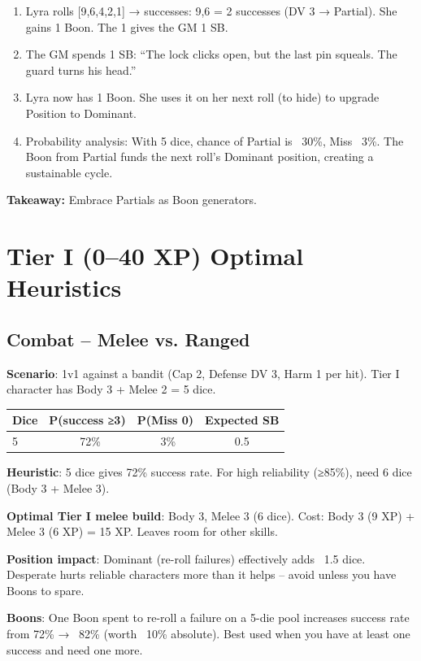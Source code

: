 \documentclass[11pt]{article}
\begin{document}
\begin{enumerate}
    \item Lyra rolls [9,6,4,2,1] → successes: 9,6 = 2 successes (DV 3 → Partial). She gains 1 Boon. The 1 gives the GM 1 SB.
    \item The GM spends 1 SB: “The lock clicks open, but the last pin squeals. The guard turns his head.”
    \item Lyra now has 1 Boon. She uses it on her next roll (to hide) to upgrade Position to Dominant.
    \item Probability analysis: With 5 dice, chance of Partial is ~30\%, Miss ~3\%. The Boon from Partial funds the next roll’s Dominant position, creating a sustainable cycle.
\end{enumerate}
\textbf{Takeaway:} Embrace Partials as Boon generators.

\section{Tier I (0–40 XP) Optimal Heuristics}

\subsection{Combat – Melee vs. Ranged}
\textbf{Scenario}: 1v1 against a bandit (Cap 2, Defense DV 3, Harm 1 per hit). Tier I character has Body 3 + Melee 2 = 5 dice.

\begin{table}[h]
\centering
\begin{tabular}{lccc}
\toprule
\textbf{Dice} & \textbf{P(success ≥3)} & \textbf{P(Miss 0)} & \textbf{Expected SB} \\
\midrule
5 & ~72\% & ~3\% & 0.5 \\
\bottomrule
\end{tabular}
\end{table}

\textbf{Heuristic}: 5 dice gives 72\% success rate. For high reliability (≥85\%), need 6 dice (Body 3 + Melee 3).

\textbf{Optimal Tier I melee build}: Body 3, Melee 3 (6 dice). Cost: Body 3 (9 XP) + Melee 3 (6 XP) = 15 XP. Leaves room for other skills.

\textbf{Position impact}: Dominant (re-roll failures) effectively adds ~1.5 dice. Desperate hurts reliable characters more than it helps – avoid unless you have Boons to spare.

\textbf{Boons}: One Boon spent to re-roll a failure on a 5-die pool increases success rate from 72\% → ~82\% (worth ~10\% absolute). Best used when you have at least one success and need one more.
\end{document}
